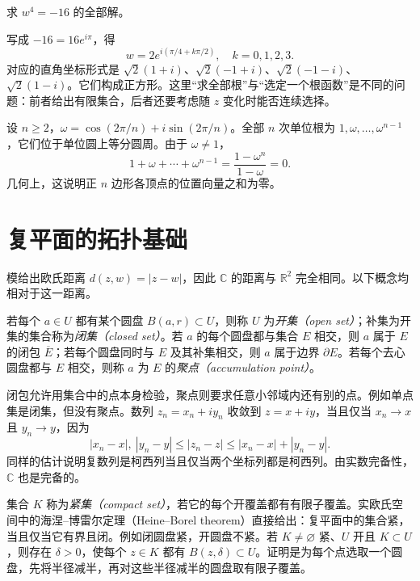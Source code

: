 \begin{example}[四次根与根的对称性]
求 $w^4=-16$ 的全部解。
\end{example}
\begin{solve}
写成 $-16=16e^{i\pi}$，得
\[
 w=2e^{i(\pi/4+k\pi/2)},\quad k=0,1,2,3.
\]
对应的直角坐标形式是 $\sqrt2(1+i)$、$\sqrt2(-1+i)$、$\sqrt2(-1-i)$、$\sqrt2(1-i)$。它们构成正方形。这里“求全部根”与“选定一个根函数”是不同的问题：前者给出有限集合，后者还要考虑随 $z$ 变化时能否连续选择。
\end{solve}

\begin{example}[单位根之和]
设 $n\ge2$，$\omega=\cos(2\pi/n)+i\sin(2\pi/n)$。全部 $n$ 次单位根为 $1,\omega,\ldots,\omega^{n-1}$，它们位于单位圆上等分圆周。由于 $\omega\ne1$，
\[
 1+\omega+\cdots+\omega^{n-1}=\frac{1-\omega^n}{1-\omega}=0.
\]
几何上，这说明正 $n$ 边形各顶点的位置向量之和为零。
\end{example}

\section{复平面的拓扑基础}

模给出欧氏距离 $d(z,w)=|z-w|$，因此 $\mathbb{C}$ 的距离与 $\mathbb{R}^2$ 完全相同。以下概念均相对于这一距离。

\begin{definition}[开集、闭集与边界]
若每个 $a\in U$ 都有某个圆盘 $B(a,r)\subset U$，则称 $U$ 为\emph{开集（open set）}；补集为开集的集合称为\emph{闭集（closed set）}。若 $a$ 的每个圆盘都与集合 $E$ 相交，则 $a$ 属于 $E$ 的闭包 $\overline E$；若每个圆盘同时与 $E$ 及其补集相交，则 $a$ 属于边界 $\partial E$。若每个去心圆盘都与 $E$ 相交，则称 $a$ 为 $E$ 的\emph{聚点（accumulation point）}。
\end{definition}

闭包允许用集合中的点本身检验，聚点则要求任意小邻域内还有别的点。例如单点集是闭集，但没有聚点。数列 $z_n=x_n+iy_n$ 收敛到 $z=x+iy$，当且仅当 $x_n\to x$ 且 $y_n\to y$，因为
\[
 |x_n-x|,\ |y_n-y|\le|z_n-z|\le|x_n-x|+|y_n-y|.
\]
同样的估计说明复数列是柯西列当且仅当两个坐标列都是柯西列。由实数完备性，$\mathbb{C}$ 也是完备的。

集合 $K$ 称为\emph{紧集（compact set）}，若它的每个开覆盖都有有限子覆盖。实欧氏空间中的海涅--博雷尔定理（Heine--Borel theorem）直接给出：复平面中的集合紧，当且仅当它有界且闭。例如闭圆盘紧，开圆盘不紧。若 $K\ne\varnothing$ 紧、$U$ 开且 $K\subset U$，则存在 $\delta>0$，使每个 $z\in K$ 都有 $B(z,\delta)\subset U$。证明是为每个点选取一个圆盘，先将半径减半，再对这些半径减半的圆盘取有限子覆盖。

